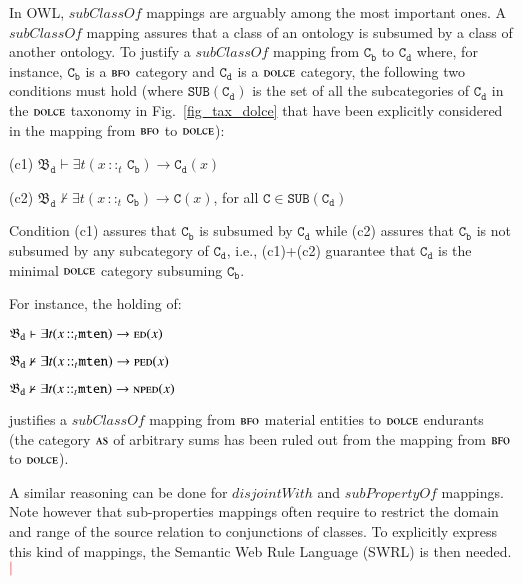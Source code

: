 \documentclass[ao]{iosart2x}
\newcommand{\nb}[1]{\textcolor{red}{$|$}\marginpar{\hspace*{-0cm}\parbox{20mm}{\scriptsize\raggedright\textcolor{red}{#1}}}}
\newcommand{\bflist}{\begin{list}{}{\setlength{\topsep}{2mm}\setlength{\parsep}{0mm}\setlength{\leftmargin}{9.2mm}\setlength{\labelwidth}{8mm}}}
\newcommand{\eflist}{\end{list}}
\newcommand{\pr}[1]{\mathtt{#1}}
\newcommand{\cn}[1]{\mathtt{#1}}
\newcommand{\dolce}{{\textsc{dolce}}}
\newcommand{\bfo}{{\textsc{bfo}}}
\newcommand {\thbfobdmap} {\ensuremath{\mathfrak{B}_\texttt{d}}}
\newcommand {\ASdcat} {\textsc{as}}
\newcommand {\EDdcat} {\textsc{ed}}
\newcommand {\NPEDdcat} {\textsc{nped}}
\newcommand {\PEDdcat} {\textsc{ped}}
\newcommand{\mtenbcat}{\cn{mten}}
\newcommand{\bfoiof}[1]{{\,::_{#1\:\!}}}
\begin{document}
In OWL, $\mathit{subClassOf}$ mappings are arguably among the most important ones. A $\mathit{subClassOf}$ mapping assures that a class of an ontology is subsumed by a class of another ontology. To justify a $\mathit{subClassOf}$ mapping from $\pr{C_b}$ to $\pr{C_d}$ where, for instance, $\pr{C_b}$ is a $\bfo$ category and $\pr{C_d}$ is a $\dolce$ category, the following two conditions must hold (where $\pr{SUB}(\pr{C_d})$ is the set of all the subcategories of $\pr{C_d}$ in the $\dolce$ taxonomy in Fig.~\ref{fig_tax_dolce} that have been explicitly considered in the mapping from $\bfo$ to $\dolce$):
\bflist
\item[(c1)] $\thbfobdmap \vdash \exists t(x \bfoiof{t} \cn{C_b}) \to \pr{C_d}(x)$ 
\item[(c2)] $\thbfobdmap \nvdash \exists t(x \bfoiof{t}  \cn{C_b}) \to \pr{C}(x)$, for all $\pr{C} \in \pr{SUB}(\pr{C_d})$ 
\eflist
%
Condition (c1) assures that $\pr{C_b}$ is subsumed by $\pr{C_d}$ while (c2) assures that $\pr{C_b}$ is not subsumed by any subcategory of $\pr{C_d}$, i.e., (c1)+(c2) guarantee that $\pr{C_d}$ is the minimal $\dolce$ category subsuming $\pr{C_b}$.  

For instance, the holding of:
%
\bflist
\item[] $\thbfobdmap \vdash \exists t(x \bfoiof{t} \mtenbcat) \to \EDdcat(x)$ 
\item[] $\thbfobdmap \nvdash \exists t(x \bfoiof{t} \mtenbcat) \to \PEDdcat(x)$ 
\item[] $\thbfobdmap \nvdash \exists t(x \bfoiof{t} \mtenbcat) \to \NPEDdcat(x)$ 
\eflist
justifies a $\mathit{subClassOf}$ mapping from $\bfo$ material entities to $\dolce$ endurants (the category $\ASdcat$ of arbitrary sums has been ruled out from the mapping from $\bfo$ to $\dolce$). 

A similar reasoning can be done for $\mathit{disjointWith}$ and $\mathit{subPropertyOf}$ mappings. Note however that sub-properties mappings often require to restrict the domain and range of the source relation to conjunctions of classes.  To explicitly express this kind of mappings, the Semantic Web Rule Language (SWRL)  \citep{swirl} is then needed.\nb{CM: non sono sicurissimo di questo, non ricordo più bene, inoltre serve un riferimento}
\end{document}
